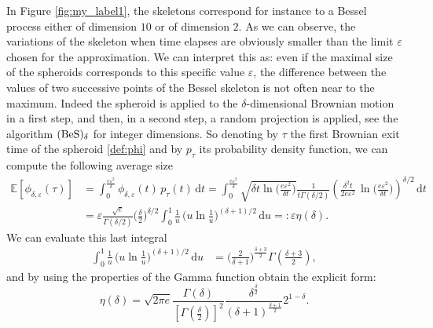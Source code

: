 \documentclass[12pt]{article}
\newcommand{\dint}{\mathrm{d}}
\numberwithin{equation}{section}
\begin{document}
In Figure \ref{fig:my_label1}, the skeletons correspond for instance to a Bessel process either of dimension $10$ or of dimension $2$. As we can observe, the variations of the skeleton when time elapses are obviously smaller than the limit $\varepsilon$ chosen for the approximation. We can interpret this as: even if the maximal size of the spheroids corresponds to this specific value $\varepsilon$, the difference between the values of two successive points of the Bessel skeleton is not often near to the maximum. Indeed the spheroid is applied to the $\delta$-dimensional Brownian motion in a first step, and then, in a second step, a random projection is applied, see the algorithm  $({\rm BeS})_\delta$ for integer dimensions. So denoting by $\tau$ the first Brownian exit time of the spheroid \eqref{def:phi} and by $p_\tau$ its probability density function, we can compute the following average size   
\begin{align*}
\mathbb{E}[\phi_{\delta,\varepsilon}(\tau)]&=\int_0^{\frac{e\varepsilon^2}{\delta}}\phi_{\delta,\varepsilon}(t)\,p_\tau(t)\,\dint t=\int_0^{\frac{e\varepsilon^2}{\delta}}\sqrt{\delta t\ln\Big( \frac{e\varepsilon^2}{\delta t} \Big)}\frac{1}{t\Gamma(\delta/2)}\left( \frac{\delta^2t}{2e\varepsilon^2}\,\ln\Big( \frac{e\varepsilon^2}{\delta t} \Big) \right)^{\delta/2}\,\dint t\\
&=\varepsilon\frac{\sqrt{e}}{\Gamma(\delta/2)}\Big( \frac{\delta}{2} \Big)^{\delta/2}\int_0^1\frac{1}{u}\,\Big( u\ln\frac{1}{u} \Big)^{(\delta+1)/2}\,\dint u=:\varepsilon \eta(\delta).
\end{align*}
We can evaluate this last integral
\begin{align*}
\int_0^1\frac{1}{u}\,\Big( u\ln\frac{1}{u} \Big)^{(\delta+1)/2}\,\dint u &= \Big(\frac{2}{\delta+1}\Big)^{\frac{\delta+3}{2}} \Gamma\left(\frac{\delta+3}{2}\right),
\end{align*}
and by using the properties of the Gamma function obtain the explicit form:
\begin{equation*}
\eta(\delta) = \sqrt{ 2\pi e}
\frac{\Gamma(\delta)}
{\left[\Gamma\left(\frac{\delta}{2}\right)\right]^2} \frac{\delta^{\frac{\delta}{2}}}{(\delta+1)^{\frac{\delta+1}{2}}}2^{1-\delta}.
\end{equation*}
\end{document}
